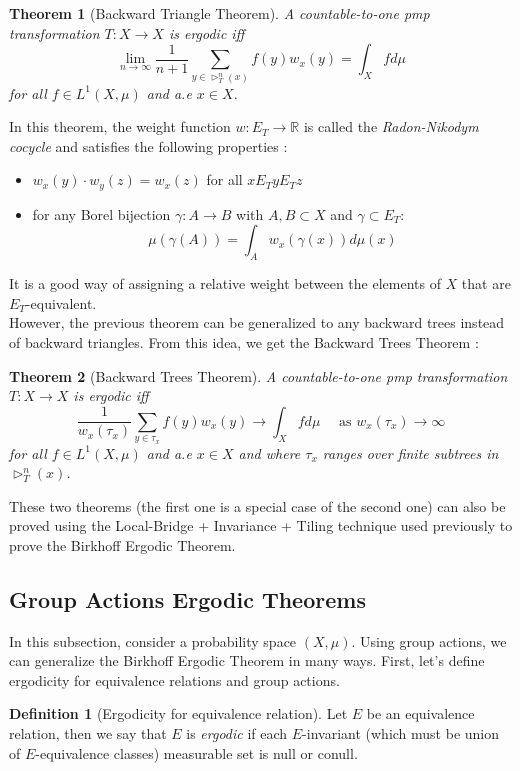 \documentclass{article}
\newtheorem{theorem}{Theorem}[section]
\theoremstyle{definition}
\newtheorem{definition}{Definition}[section]
\begin{document}
\begin{theorem}[Backward Triangle Theorem]
    A countable-to-one pmp transformation $T:X\to X$ is ergodic iff 
    $$\lim_{n\to\infty}\frac{1}{n+1}\sum_{y\in\rhd_T^n(x)}f(y)w_x(y) =\int_Xfd\mu$$ for all $f\in L^1(X,\mu)$ and a.e $x\in X$.
\end{theorem}

In this theorem, the weight function $w:E_T\to\mathbb{R}$ is called the \textit{Radon-Nikodym cocycle} and satisfies the following properties :
\begin{itemize}
    \item $w_x(y)\cdot w_y(z) = w_x(z)$ for all $xE_TyE_Tz$\\
    \item for any Borel bijection $\gamma : A\to B$ with $A,B\subset X$ and $\gamma \subset E_T$:
    $$\mu(\gamma(A))= \int_Aw_x(\gamma (x))d\mu(x)$$
\end{itemize}
It is a good way of assigning a relative weight between the elements of $X$ that are $E_T$-equivalent.\\

However, the previous theorem can be generalized to any backward trees instead of backward triangles. From this idea, we get the Backward Trees Theorem :

\begin{theorem}[Backward Trees Theorem]
    A countable-to-one pmp transformation $T:X\to X$ is ergodic iff 
    $$\frac{1}{w_x(\tau_x)}\sum_{y\in\tau_x}f(y)w_x(y) \to\int_Xfd\mu \quad \text{ as } w_x(\tau_x)\to\infty$$ for all $f\in L^1(X,\mu)$ and a.e $x\in X$ and where $\tau_x$ ranges over finite subtrees in $\rhd_T^n(x)$.
\end{theorem}

These two theorems (the first one is a special case of the second one) can also be proved using the Local-Bridge + Invariance + Tiling technique used previously to prove the Birkhoff Ergodic Theorem.

\subsection{Group Actions Ergodic Theorems}
In this subsection, consider a probability space $(X,\mu)$. Using group actions, we can generalize the Birkhoff Ergodic Theorem in many ways. First, let's define ergodicity for equivalence relations and group actions.

\begin{definition}[Ergodicity for equivalence relation]
    Let $E$ be an equivalence relation, then we say that $E$ is \textit{ergodic} if each $E$-invariant (which must be union of $E$-equivalence classes) measurable set is null or conull. 
\end{definition}
\end{document}
